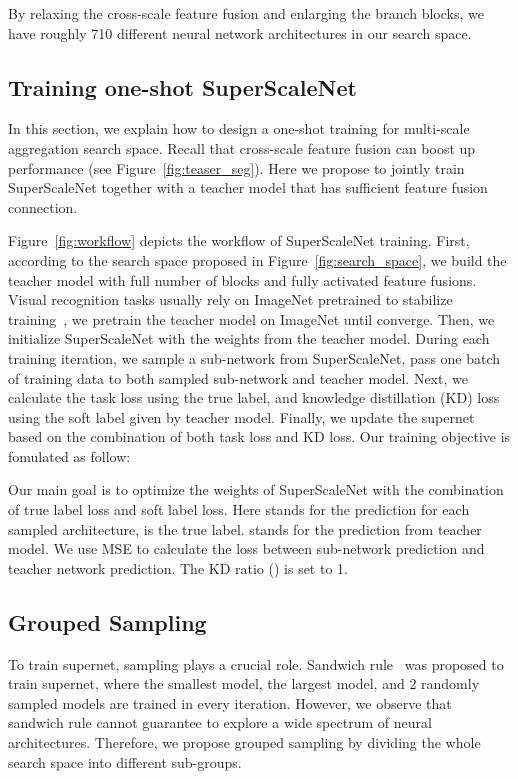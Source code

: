 \documentclass[final]{cvpr}
\newcommand{\supernet}{SuperScaleNet\xspace}
\begin{document}
By relaxing the cross-scale feature fusion and enlarging the branch blocks, we have roughly 710  different neural network architectures in our search space.



\subsection{Training one-shot \supernet}
In this section, we explain how to design a one-shot training for multi-scale aggregation search space. 
Recall that cross-scale feature fusion can boost up performance (see Figure~\ref{fig:teaser_seg}).
Here we propose to jointly train \supernet together with a teacher model that has sufficient feature fusion connection.  

Figure~\ref{fig:workflow} depicts the workflow of \supernet training. 
First, according to the search space proposed in Figure~\ref{fig:search_space}, we build the teacher model with full number of blocks and fully activated feature fusions. 
Visual recognition tasks usually rely on ImageNet pretrained to stabilize training~\cite{wang2020deep,ren2015faster}, we pretrain the teacher model on ImageNet until converge. 
Then, we initialize \supernet with the weights from the teacher model. During each training iteration, we sample a sub-network from \supernet, pass one batch of training data to both sampled sub-network and teacher model. 
Next, we calculate the task loss using the true label, and knowledge distillation (KD) loss using the soft label given by teacher model.
Finally, we update the supernet based on the combination of both task loss and KD loss. 
Our training objective is fomulated as follow:


Our main goal is to optimize the weights of \supernet 
with the combination of true label loss and soft label loss.
Here  stands for the prediction for each sampled architecture,  is the true label.  stands for the prediction from teacher model. 
We use MSE to calculate the loss between sub-network prediction and teacher network prediction. The KD ratio () is set to 1.


\subsection{Grouped Sampling}
\label{sec:grouped_sampling}
To train supernet, sampling plays a crucial role. 
Sandwich rule~\cite{yu2019universally,yu2020bignas} was proposed  to train supernet, where  the smallest model, the largest model, and 2 randomly sampled models are trained in every iteration.
However, we observe that sandwich rule cannot guarantee to explore a wide spectrum of neural architectures. Therefore, we propose grouped sampling by dividing the whole search space into different sub-groups. 
\end{document}
